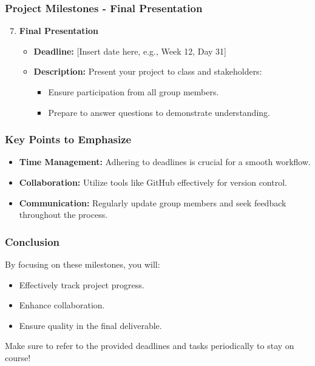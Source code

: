 \documentclass[aspectratio=169]{beamer}
\begin{document}
\begin{frame}[fragile]
    \frametitle{Project Milestones - Final Presentation}
    \begin{enumerate}
        \setcounter{enumi}{6}
        \item \textbf{Final Presentation}
        \begin{itemize}
            \item \textbf{Deadline:} [Insert date here, e.g., Week 12, Day 31]
            \item \textbf{Description:} Present your project to class and stakeholders:
            \begin{itemize}
                \item Ensure participation from all group members.
                \item Prepare to answer questions to demonstrate understanding.
            \end{itemize}
        \end{itemize}
    \end{enumerate}
\end{frame}

\begin{frame}[fragile]
    \frametitle{Key Points to Emphasize}
    \begin{itemize}
        \item \textbf{Time Management:} Adhering to deadlines is crucial for a smooth workflow.
        \item \textbf{Collaboration:} Utilize tools like GitHub effectively for version control.
        \item \textbf{Communication:} Regularly update group members and seek feedback throughout the process.
    \end{itemize}
\end{frame}

\begin{frame}[fragile]
    \frametitle{Conclusion}
    By focusing on these milestones, you will:
    \begin{itemize}
        \item Effectively track project progress.
        \item Enhance collaboration.
        \item Ensure quality in the final deliverable.
    \end{itemize}
    Make sure to refer to the provided deadlines and tasks periodically to stay on course!
\end{frame}
\end{document}
